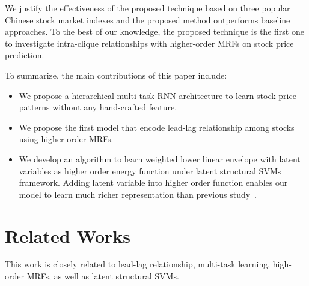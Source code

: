 \documentclass[sigconf,anonymous,review]{acmart}
\renewcommand{\citename}{\citet}
\renewcommand{\cite}{\citep}
\begin{document}
We justify the effectiveness of the proposed technique based on three popular Chinese stock market indexes and the proposed method outperforms baseline approaches. To the best of our knowledge, the proposed technique is the first one to investigate intra-clique relationships with higher-order MRFs on stock price prediction.
  

To summarize, the main contributions of this paper include: 
\begin{itemize}
\item  We propose a hierarchical multi-task RNN architecture to learn stock price
patterns without any hand-crafted feature.
\item We propose the first model that encode lead-lag relationship among stocks using
higher-order MRFs. 
\item We develop an algorithm to learn weighted lower linear envelope with latent variables as higher order energy function under latent structural SVMs framework. Adding latent variable into higher order function
enables our model to learn much richer representation than
previous study~\cite{gouldlearning}.
\end{itemize}

\section{Related Works}
\label{sec:background}
This work is closely related to lead-lag relationship, multi-task learning, high-order MRFs, as well as latent structural SVMs.
\end{document}
